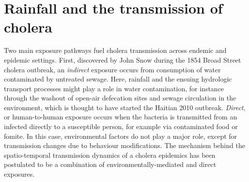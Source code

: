 \section{Rainfall and the transmission of cholera}\label{sec:rainfall-cholera-transmission}
Two main exposure pathways fuel cholera transmission across endemic and epidemic settings.
First, discovered by John Snow during the 1854 Broad Street cholera outbreak, an \textit{indirect} exposure occurs from consumption of water contaminated by untreated sewage\cite{Snow:ModeCommunicationCholera:1855}. Here, rainfall and the ensuing hydrologic transport processes might play a role in water contamination, for instance through the washout of open-air defecation sites and sewage circulation in the environment, which is thought to have started the Haitian 2010 outbreak\cite{Piarroux:UnderstandingCholeraEpidemic:2011}.
\textit{Direct}, or human-to-human exposure occurs when the bacteria is transmitted from an infected directly to a susceptible person, for example via contaminated food or fomite. In this case, environmental factors do not play a major role, except for transmission changes due to behaviour modifications.
The mechanism behind the spatio-temporal transmission dynamics of a cholera epidemics has been postulated to be a combination of environmentally-mediated and direct exposures\cite[-4\baselineskip]{Sugimoto:HouseholdTransmissionVibrio:2014,Bi:MicroscaleSpatialClustering:2016,Lessler:MeasuringSpatialDependence:2016,Rinaldo:ModelingKeyDrivers:2017}.
